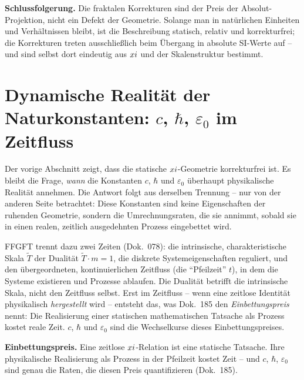 \begin{schlussfolgerung}
\textbf{Schlussfolgerung.} Die fraktalen Korrekturen sind der Preis der
Absolut-Projektion, nicht ein Defekt der Geometrie. Solange man in natürlichen
Einheiten und Verhältnissen bleibt, ist die Beschreibung statisch, relativ und
korrekturfrei; die Korrekturen treten ausschließlich beim Übergang in absolute
SI-Werte auf -- und sind selbst dort eindeutig aus $xi$ und der
Skalenstruktur bestimmt.
\end{schlussfolgerung}

\section{Dynamische Realität der Naturkonstanten: $c$, $\hbar$, $\varepsilon_0$ im Zeitfluss}
\label{sec:dyn-konstanten}

Der vorige Abschnitt zeigt, dass die statische $xi$-Geometrie korrekturfrei
ist. Es bleibt die Frage, \emph{wann} die Konstanten $c$, $\hbar$ und
$\varepsilon_0$ überhaupt physikalische Realität annehmen. Die Antwort folgt aus
derselben Trennung -- nur von der anderen Seite betrachtet: Diese Konstanten sind
keine Eigenschaften der ruhenden Geometrie, sondern die Umrechnungsraten, die sie
annimmt, sobald sie in einen realen, zeitlich ausgedehnten Prozess eingebettet
wird.

FFGFT trennt dazu zwei Zeiten (Dok.~078): die intrinsische, charakteristische
Skala $\tilde T$ der Dualität $\tilde T\cdot m=1$, die diskrete
Systemeigenschaften reguliert, und den übergeordneten, kontinuierlichen Zeitfluss
(die ``Pfeilzeit'' $t$), in dem die Systeme existieren und Prozesse ablaufen. Die
Dualität betrifft die intrinsische Skala, nicht den Zeitfluss selbst. Erst im
Zeitfluss -- wenn eine zeitlose Identität physikalisch \emph{hergestellt} wird --
entsteht das, was Dok.~185 den \emph{Einbettungspreis} nennt: Die Realisierung
einer statischen mathematischen Tatsache als Prozess kostet reale Zeit. $c$,
$\hbar$ und $\varepsilon_0$ sind die Wechselkurse dieses Einbettungspreises.

\begin{erkenntnis}
\textbf{Einbettungspreis.} Eine zeitlose $xi$-Relation ist eine statische
Tatsache. Ihre physikalische Realisierung als Prozess in der Pfeilzeit kostet
Zeit -- und $c$, $\hbar$, $\varepsilon_0$ sind genau die Raten, die diesen Preis
quantifizieren (Dok.~185).
\end{erkenntnis}

